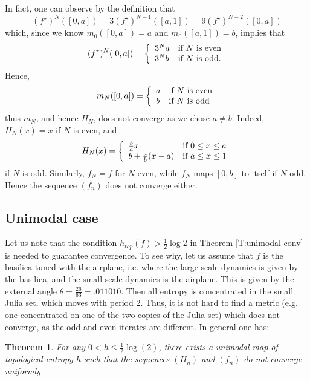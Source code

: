 \documentclass[11pt]{amsart}
\newtheorem{theorem}{Theorem}[section]
\begin{document}
In fact, one can observe by the definition that 
$$(f^\star)^N([0, a]) = 3 (f^\star)^{N-1}([a, 1]) = 9 (f^\star)^{N-2}([0, a])$$
which, since we know $m_0([0, a]) = a$ and $m_0([a, 1]) = b$, implies that 
$$(f^\star)^N([0, a]) = \left\{ \begin{array}{ll}
3^N a & \textup{if }N \textup{ is even} \\
3^N b & \textup{if }N \textup{ is odd.} 
\end{array}\right.$$
Hence, 
$$m_N([0, a]) = \left\{ \begin{array}{ll}
a & \textup{if }N \textup{ is even} \\
b & \textup{if }N \textup{ is odd} 
\end{array}\right.$$
thus $m_N$, and hence $H_N$, does not converge as we chose $a \neq b$. Indeed, 
$H_N(x) = x$ if $N$ is even, and 
$$H_N(x) = \left\{ \begin{array}{ll} \frac{b}{a} x & \textup{if }0 \leq x \leq a \\ 
b + \frac{a}{b} (x-a) &  \textup{if }a \leq x \leq 1 \end{array} \right.$$
if $N$ is odd. Similarly, $f_N = f$ for $N$ even, while $f_N$ maps $[0, b]$ to itself if $N$ odd. 
Hence the sequence $(f_n)$ does not converge either.

\subsection{Unimodal case}
Let us note that the condition $h_{top}(f) > \frac{1}{2} \log 2$ in Theorem \ref{T:unimodal-conv} is needed to guarantee convergence. 
To see why, let us assume that $f$ is the basilica tuned with the airplane, i.e. where the large scale dynamics is 
given by the basilica, and the small scale dynamics is the airplane. 
This is given by the external angle $\theta = \frac{26}{63} = .\overline{011010}$.
Then all entropy is concentrated in the small Julia set, which moves with period $2$. Thus, 
it is not hard to find a metric (e.g. one concentrated on one of the two copies of the Julia set) which 
does not converge, as the odd and even iterates are different.
In general one has: 

\begin{theorem}
For any $0 < h \leq \frac{1}{2} \log(2)$, there exists a unimodal map of topological entropy $h$ 
such that the sequences $(H_n)$ and $(f_n)$ do not converge uniformly.  
\end{theorem}
\end{document}
